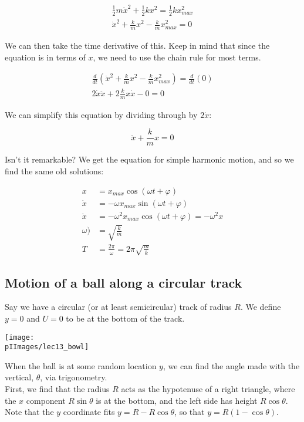 \begin{align}
\frac{1}{2} m \dot{x}^2 + \frac{1}{2} k x^2 = \frac{1}{2} k x_{max}^2\\
\dot{x}^2 + \frac{k}{m} x^2 - \frac{k}{m} x_{max}^2 = 0
\end{align}

We can then take the time derivative of this. Keep in mind that since the equation is in terms of $x$, we need to use the chain rule for most terms.

\begin{align}
\frac{d}{dt} \left(\dot{x}^2 + \frac{k}{m} x^2 - \frac{k}{m} x_{max}^2\right) = \frac{d}{dt} (0)\\
2 \dot{x} \ddot{x} + 2 \frac{k}{m} x \dot{x} - 0 = 0
\end{align}

We can simplify this equation by dividing through by $2 \dot{x}$:

\begin{equation}
\ddot{x} + \frac{k}{m} x = 0
\end{equation}

Isn't it remarkable? We get the equation for simple harmonic motion, and so we find the same old solutions:

\begin{align}
x        &= x_{max} \cos(\omega t + \varphi)\\
\dot{x}  &= - \omega x_{max} \sin(\omega t + \varphi)\\
\ddot{x} &= - \omega^2 x_{max} \cos(\omega t + \varphi) = -\omega^2 x\\
\omega  )    &= \sqrt{\frac{k}{m}}\\
T           &= \frac{2 \pi}{\omega} = 2 \pi \sqrt{\frac{m}{k}}
\end{align}

\subsection{Motion of a ball along a circular track}

Say we have a circular (or at least semicircular) track of radius $R$. We define $y = 0$ and $U = 0$ to be at the bottom of the track.

\begin{center}
\texttt{[image: \\pIImages/lec13\_bowl]}
\end{center}

When the ball is at some random location $y$, we can find the angle made with the vertical, $\theta$, via trigonometry.\\
First, we find that the radius $R$ acts as the hypotenuse of a right triangle, where the $x$ component $R \sin \theta$ is at the bottom, and the left side has height $R \cos \theta$. Note that the $y$ coordinate fits $y = R - R\cos \theta$, so that $y = R (1 - \cos \theta)$.

